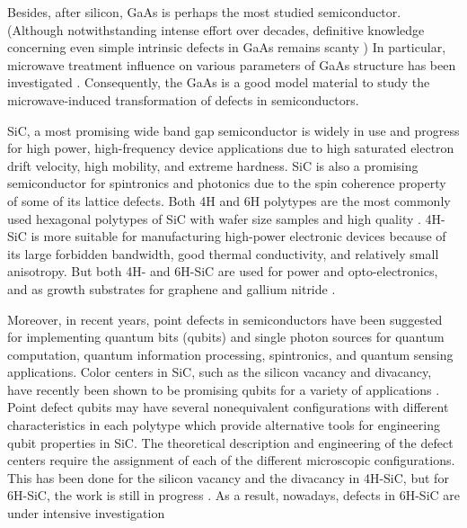 \documentclass[10pt]{iopart}
\begin{document}
Besides, after silicon, GaAs is perhaps the most studied semiconductor.
(Although notwithstanding intense effort over decades, definitive knowledge concerning
even simple intrinsic defects in GaAs remains scanty \cite{EL6:Schultz})
In particular, microwave treatment influence on various parameters of GaAs structure has been investigated
\cite{MW:Rev,ZOHM2000,BHUNIA1998,Bacherikov2003En,Pashkov1994En,
BoltovetsEn,Milenin1994En,BelyaevIntac,ASHKINADZE1996,ProcSPIE,Belyaev1998JTFEn,
Bacherikov2008En,Konakova2015En,Konakova2012FTPEn}.
Consequently, the GaAs is a good model material to study the microwave-induced transformation of defects in semiconductors.


SiC,  a  most  promising  wide  band  gap  semiconductor is widely in use and progress for high power, high-frequency
device applications due  to high saturated electron drift velocity, high mobility,  and  extreme  hardness.
SiC  is  also  a  promising  semiconductor  for  spintronics  and  photonics  due  to  the  spin  coherence
property of some of its lattice defects.
Both 4H and 6H polytypes are the most commonly used hexagonal
polytypes of SiC with wafer size samples and high quality \cite{6HSiC:VV2019}.
4H-SiC is more suitable for manufacturing high-power electronic devices
because of its large forbidden bandwidth, good thermal conductivity, and relatively small anisotropy.
But both 4H- and 6H-SiC are used for power and
opto-electronics, and as growth substrates for graphene and
gallium nitride \cite{SiC:Falk13}.

Moreover, in recent years, point defects in semiconductors have been suggested for implementing quantum bits (qubits)
and single photon sources for quantum computation, quantum information processing, spintronics,
and quantum sensing applications.
Color centers in SiC, such as the silicon vacancy and divacancy,
have recently been shown to be promising qubits for a variety of
applications \cite{6HSiC:VV2019,4HSiC:VV,6HSiC:Singh2021,4HSiC:Vc}.
Point defect qubits may have several nonequivalent configurations with different
characteristics in each polytype which provide alternative tools for engineering qubit properties in SiC.
The theoretical description and engineering of the defect centers
require the assignment of each of the different microscopic configurations.
This has been done for the silicon vacancy and the divacancy in 4H-SiC,
but for 6H-SiC, the work is still in progress \cite{6HSiC:VV2019}.
As a result, nowadays, defects in 6H-SiC are under intensive
investigation \cite{SiC:NV,6HSiC:VV2019,SiC:Falk13,6HSiC:vac2021,SiC:Soltamov21,SiC:Tissot2021,6HSiC:Singh2021,SiCWei}
\end{document}
